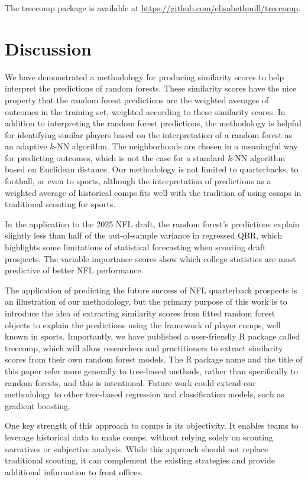 \documentclass[Review, sageh, times]{sagej}
\begin{document}
The treecomp package is available at \url{https://github.com/elisabethmill/treecomp}.

\section{Discussion}
\label{sec:discussion}

We have demonstrated a methodology for producing similarity scores to help interpret the predictions of random forests. These similarity scores have the nice property that the random forest predictions are the weighted averages of outcomes in the training set, weighted according to these similarity scores. In addition to interpreting the random forest predictions, the methodology is helpful for identifying similar players based on the interpretation of a random forest as an adaptive $k$-NN algorithm. The neighborhoods are chosen in a meaningful way for predicting outcomes, which is not the case for a standard $k$-NN algorithm based on Euclidean distance. Our methodology is not limited to quarterbacks, to football, or even to sports, although the interpretation of predictions as a weighted average of historical comps fits well with the tradition of using comps in traditional scouting for sports.

In the application to the 2025 NFL draft, the random forest's predictions explain slightly less than half of the out-of-sample variance in regressed QBR, which highlights some limitations of statistical forecasting when scouting draft prospects. The variable importance scores show which college statistics are most predictive of better NFL performance.

The application of predicting the future success of NFL quarterback prospects is an illustration of our methodology, but the primary purpose of this work is to introduce the idea of extracting similarity scores from fitted random forest objects to explain the predictions using the framework of player comps, well known in sports. Importantly, we have published a user-friendly R package called treecomp, which will allow researchers and practitioners to extract similarity scores from their own random forest models. The R package name and the title of this paper refer more generally to tree-based methods, rather than specifically to random forests, and this is intentional. Future work could extend our methodology to other tree-based regression and classification models, such as gradient boosting.

One key strength of this approach to comps is its objectivity. It enables teams to leverage historical data to make comps, without relying solely on scouting narratives or subjective analysis. While this approach should not replace traditional scouting, it can complement the existing strategies and provide additional information to front offices. 
\end{document}
